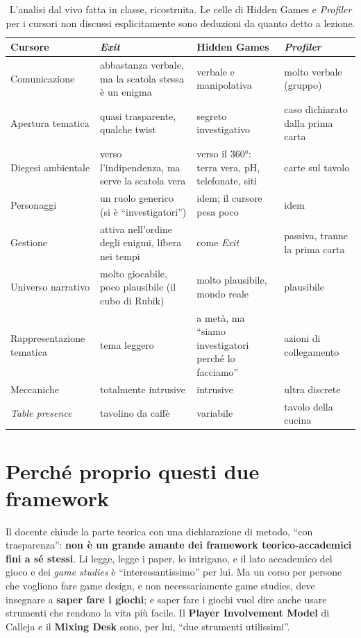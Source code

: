 \begin{table}[htbp]
\centering
\small
\begin{tabular}{@{}p{2.6cm}p{3.4cm}p{3.4cm}p{3.4cm}@{}}
\toprule
\textbf{Cursore} & \textbf{\emph{Exit}} & \textbf{Hidden Games} &
\textbf{\emph{Profiler}} \\
\midrule
Comunicazione & abbastanza verbale, ma la scatola stessa è un enigma & verbale
e manipolativa & molto verbale (gruppo) \\
Apertura tematica & quasi trasparente, qualche twist & segreto investigativo &
caso dichiarato dalla prima carta \\
Diegesi ambientale & verso l'indipendenza, ma serve la scatola vera & verso il
360°: terra vera, pH, telefonate, siti & carte sul tavolo \\
Personaggi & un ruolo generico (si è ``investigatori'') & idem; il cursore pesa
poco & idem \\
Gestione & attiva nell'ordine degli enigmi, libera nei tempi & come \emph{Exit}
& passiva, tranne la prima carta \\
Universo narrativo & molto giocabile, poco plausibile (il cubo di Rubik) &
molto plausibile, mondo reale & plausibile \\
Rappresentazione tematica & tema leggero & a metà, ma ``siamo investigatori
perché lo facciamo'' & azioni di collegamento \\
Meccaniche & totalmente intrusive & intrusive & ultra discrete \\
\emph{Table presence} & tavolino da caffè & variabile & tavolo della cucina \\
\bottomrule
\end{tabular}
\caption{L'analisi dal vivo fatta in classe, ricostruita. Le celle di Hidden
Games e \emph{Profiler} per i cursori non discussi esplicitamente sono deduzioni
da quanto detto a lezione.}
\label{a3:tab:analisi}
\end{table}

\section{Perché proprio questi due framework}
\label{a3:sec:perche-due}

Il docente chiude la parte teorica con una dichiarazione di metodo, ``con
trasparenza'': \textbf{non è un grande amante dei framework teorico-accademici
fini a sé stessi}. Li legge, legge i paper, lo intrigano, e il lato accademico
del gioco e dei \emph{game studies} è ``interessantissimo'' per lui. Ma un corso
per persone che vogliono fare game design, e non necessariamente game studies,
deve insegnare a \textbf{saper fare i giochi}; e saper fare i giochi vuol dire
anche usare strumenti che rendono la vita più facile. Il \textbf{Player
Involvement Model} di Calleja e il \textbf{Mixing Desk} sono, per lui, ``due
strumenti utilissimi''.

